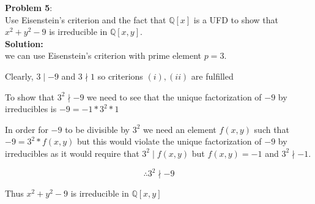 \documentclass[11pt]{article}
\newcommand{\prob}[3]{\begin{flushleft}
        \textbf{Problem #1}: \\
        #2 
		\textbf{Solution:} 
		#3

\end{flushleft}}
\begin{document}
\prob{5}{
  Use Eisenstein's criterion and the fact that $\mathbb{Q}[x]$ is a UFD to show that $x^2 + y^2 - 9$ is irreducible in $\mathbb{Q}[x,y]$. \\
}{ \\
  we can use Eisenstein's criterion with prime element $p = 3$.

  Clearly, $3 \mid -9$ and $3 \nmid 1$ so criterions $(i), (ii)$ are fulfilled

  To show that $3^2 \nmid -9$ we need to see that the unique factorization of $-9$ by irreducibles is $-9 = -1 * 3^2 * 1$

  In order for $-9$ to be divisible by $3^2$ we need an element $f(x,y)$ such that
  $-9 = 3^2 * f(x,y)$ but this would violate the unique factorization of $-9$ by irreducibles as it would require that $3^2 \mid f(x,y)$ but $f(x,y) = -1$ and $3^2 \nmid -1$.

  $$\therefore 3^2 \nmid -9$$

  Thus $x^2 + y^2 - 9$ is irreducible in $\mathbb{Q}[x,y]$
}
\end{document}
